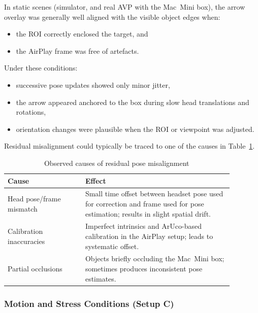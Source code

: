 In static scenes (simulator, and real AVP with the Mac~Mini box), the arrow overlay was generally well aligned with the visible object edges when:

\begin{itemize}
    \item the ROI correctly enclosed the target, and
    \item the AirPlay frame was free of artefacts.
\end{itemize}

Under these conditions:

\begin{itemize}
    \item successive pose updates showed only minor jitter,
    \item the arrow appeared anchored to the box during slow head translations and rotations,
    \item orientation changes were plausible when the ROI or viewpoint was adjusted.
\end{itemize}

Residual misalignment could typically be traced to one of the causes in Table~\ref{tab:misalignment-causes-eval}.

\begin{table}[H]
    \centering
    \caption{Observed causes of residual pose misalignment}
    \label{tab:misalignment-causes-eval}
    \begin{tabular}{p{0.30\linewidth}p{0.58\linewidth}}
        \toprule
        \textbf{Cause} & \textbf{Effect} \\
        \midrule
        Head pose/frame mismatch &
        Small time offset between headset pose used for correction and frame used for pose estimation; results in slight spatial drift. \\
        Calibration inaccuracies &
        Imperfect intrinsics and ArUco-based calibration in the AirPlay setup; leads to systematic offset. \\
        Partial occlusions &
        Objects briefly occluding the Mac~Mini box; sometimes produces inconsistent pose estimates. \\
        \bottomrule
    \end{tabular}
\end{table}

\subsubsection{Motion and Stress Conditions (Setup C)}

